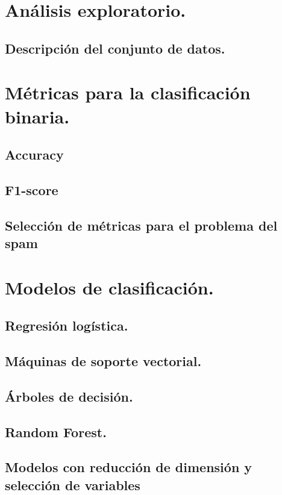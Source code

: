 \documentclass[12pt, letterpaper]{article}
\begin{document}
\section{Análisis exploratorio.}
\subsection{Descripción del conjunto de datos.}

\section{Métricas para la clasificación binaria.}

\subsection{Accuracy}

\subsection{F1-score}

\subsection{Selección de métricas para el problema del spam}

\section{Modelos de clasificación.}

\subsection{Regresión logística.}

\subsection{Máquinas de soporte vectorial.}

\subsection{Árboles de decisión.}

\subsection{Random Forest.}

\subsection{Modelos con reducción de dimensión y selección de variables}
\end{document}
